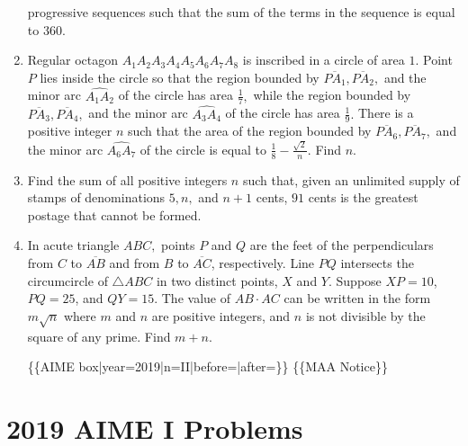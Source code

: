 \documentclass{article}
\begin{document}
\begin{enumerate}[label=\arabic*., itemsep=0.5em]
progressive sequences such that the sum of the terms in the sequence is equal to \(360.\)\par \vspace{0.5em}\item Regular octagon \(A_1A_2A_3A_4A_5A_6A_7A_8\) is inscribed in a circle of area \(1.\) Point \(P\) lies inside the circle so that the region bounded by \(\overline{PA_1},\overline{PA_2},\) and the minor arc \(\widehat{A_1A_2}\) of the circle has area \(\tfrac{1}{7},\) while the region bounded by \(\overline{PA_3},\overline{PA_4},\) and the minor arc \(\widehat{A_3A_4}\) of the circle has area \(\tfrac{1}{9}.\) There is a positive integer \(n\) such that the area of the region bounded by \(\overline{PA_6},\overline{PA_7},\) and the minor arc \(\widehat{A_6A_7}\) of the circle is equal to \(\tfrac{1}{8}-\tfrac{\sqrt2}{n}.\) Find \(n.\)\par \vspace{0.5em}\item Find the sum of all positive integers \(n\) such that, given an unlimited supply of stamps of denominations \(5,n,\) and \(n+1\) cents, \(91\) cents is the greatest postage that cannot be formed.\par \vspace{0.5em}\item In acute triangle \(ABC,\) points \(P\) and \(Q\) are the feet of the perpendiculars from \(C\) to \(\overline{AB}\) and from \(B\) to \(\overline{AC}\), respectively. Line \(PQ\) intersects the circumcircle of \(\triangle ABC\) in two distinct points, \(X\) and \(Y\). Suppose \(XP=10\), \(PQ=25\), and \(QY=15\). The value of \(AB\cdot AC\) can be written in the form \(m\sqrt n\) where \(m\) and \(n\) are positive integers, and \(n\) is not divisible by the square of any prime. Find \(m+n\).



\{\{AIME box|year=2019|n=II|before=|after=\}\}
\{\{MAA Notice\}\}\par \vspace{0.5em}
\end{enumerate}
\newpage\section*{2019 AIME I Problems}
\end{document}
